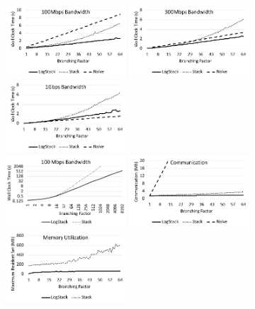 \begin{figure}[t]
  \begin{adjustwidth}{-0.13\textwidth}{-0.13\textwidth}
  	\centering
    \includegraphics[width=0.4\textwidth]{fig/100mbps}
    \includegraphics[width=0.4\textwidth]{fig/300mbps}
    \includegraphics[width=0.4\textwidth]{fig/1gbps}
  	\\
    \includegraphics[width=0.4\textwidth]{fig/highbranching}
    \includegraphics[width=0.4\textwidth]{fig/comm}
    \includegraphics[width=0.4\textwidth]{fig/memutil}

\end{adjustwidth}
\end{figure}
